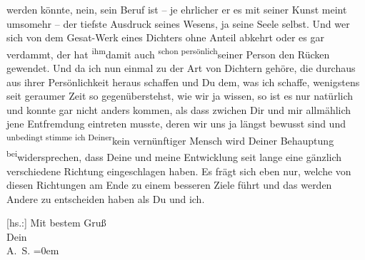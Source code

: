                werden könnte, nein, sein Beruf ist – je ehrlicher er es mit seiner Kunst meint
               umsomehr – der tiefste Ausdruck seines Wesens, ja seine Seele selbst. Und wer sich
               von dem \introOben{}Gesa{\geminationm}t-\introOben{}Werk eines
               Dichters ohne Anteil abkehrt oder es gar verdammt, der hat \substVorne{}\textsuperscript{ihm}\substDazwischen{}damit\substHinten{} auch \substVorne{}\textsuperscript{schon persönlich}{\allowbreak}\substDazwischen{}seiner Person\substHinten{} den Rücken gewendet. Und da ich nun einmal zu der Art von Dichtern gehöre,
               die  durchaus aus ihrer Persönlichkeit heraus schaffen und Du dem, was
               ich schaffe, wenigstens seit geraumer Zeit so gegenüberstehst, wie wir ja wissen, so
               ist es nur natürlich und konnte gar nicht anders kommen, als dass zwichen Dir und mir
               allmählich {\pb}jene Entfremdung eintreten
               musste, deren wir uns ja längst bewusst sind und \substVorne{}\textsuperscript{unbedingt stimme ich Deiner}{\allowbreak}\substDazwischen{}kein vernünftiger Mensch wird Deiner\substHinten{} Behauptung \substVorne{}\textsuperscript{bei}\substDazwischen{}widersprechen\substHinten{}, dass Deine und meine Entwicklung seit lange eine gänzlich verschiedene
               Richtung eingeschlagen haben. Es frägt sich eben nur, welche von diesen Richtungen am
               Ende zu einem besseren Ziele führt und das werden Andere zu entscheiden haben als Du
               und ich.\pend
           
\pstart
           {[}hs.:{]} Mit bestem Gruß {\\[\baselineskip]}Dein {\\[\baselineskip]}\spacefill\mbox{A. S.}\pend
           \leftskip=0em{}\endnumbering{}  
      